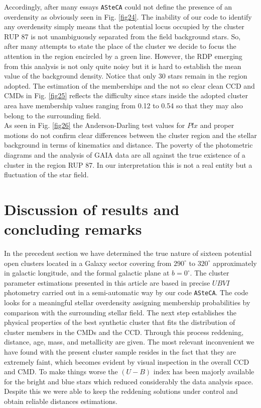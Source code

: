 \documentclass{aa}
\begin{document}
Accordingly, after many essays \texttt{ASteCA} could not define the presence of
an overdensity as obviously seen in Fig. \ref{fig24}. The inability of our code
to identify any overdensity simply means that the potential locus occupied by
the cluster RUP 87 is not unambiguously separated from the field background
stars. So, after many attempts to state the place of the cluster we decide to
focus the attention in the region encircled by a green line. However, the RDP
emerging from this analysis is not only quite noisy but it is hard to establish
the mean value of the background density. Notice that only 30 stars remain in
the region adopted. The estimation of the memberships and the not so clear clean
CCD and CMDs in Fig. \ref{fig25} reflects the difficulty since stars inside the
adopted cluster area have membership values ranging from 0.12 to 0.54 so that
they may also belong to the surrounding field.\\

As seen in Fig. \ref{fig26} the Anderson-Darling test values for $Plx$ and
proper motions do not confirm clear differences between the cluster region and
the stellar background in terms of kinematics and distance. The poverty of the
photometric diagrams and the analysis of GAIA data are all against the true
existence of a cluster in the region RUP 87. In our interpretation this is
not a real entity but a fluctuation of the star field.





\section{Discussion of results and concluding remarks}
\label{sec:results_concl}

In the precedent section we have determined the true nature of sixteen potential
open clusters located in a Galaxy sector covering from $290^\circ$ to
$320^\circ$ approximately in galactic longitude, and the formal
galactic plane at $b = 0^\circ$.
The cluster parameter estimations presented in this article
are based in precise $UBVI$ photometry carried out in a semi-automatic way by
our code \texttt{ASteCA}. The code looks for a meaningful stellar overdensity
assigning membership probabilities by comparison with the surrounding stellar
field.
The next step establishes the physical properties of the best synthetic cluster
that fits the distribution of cluster members in the CMDs and the CCD.
Through this process reddening, distance, age, mass, and metallicity are
given.
The most relevant inconvenient we have found with the present cluster
sample resides in the fact that they are extremely faint, which becomes evident
by visual inspection in the overall CCD and CMD.
To make things worse the $(U-B)$ index has been majorly available for
the bright and blue stars which reduced considerably the data analysis space.
Despite this we were able to keep the reddening solutions under control and
obtain reliable distances estimations.
\end{document}
